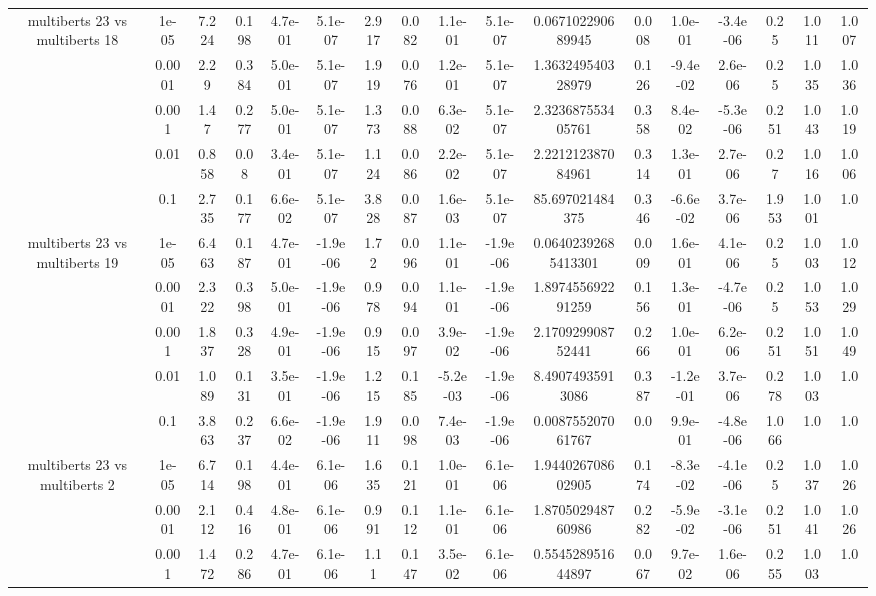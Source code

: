 \begin{tabular}{|c|c|c|c|c|c|c|c|c|c|c|c|c|c|c|c|c|}
\hline
\multirow{5}{*}{multiberts 23 vs multiberts 18} & 1e-05 & 7.224 & 0.198 & 4.7e-01 & 5.1e-07 & 2.917 & 0.082 & 1.1e-01 & 5.1e-07 & 0.067102290689945 & 0.008 & 1.0e-01 & -3.4e-06 & 0.25 & 1.011 & 1.007 \\
 & 0.0001 & 2.29 & 0.384 & 5.0e-01 & 5.1e-07 & 1.919 & 0.076 & 1.2e-01 & 5.1e-07 & 1.363249540328979 & 0.126 & -9.4e-02 & 2.6e-06 & 0.25 & 1.035 & 1.036 \\
 & 0.001 & 1.47 & 0.277 & 5.0e-01 & 5.1e-07 & 1.373 & 0.088 & 6.3e-02 & 5.1e-07 & 2.323687553405761 & 0.358 & 8.4e-02 & -5.3e-06 & 0.251 & 1.043 & 1.019 \\
 & 0.01 & 0.858 & 0.08 & 3.4e-01 & 5.1e-07 & 1.124 & 0.086 & 2.2e-02 & 5.1e-07 & 2.221212387084961 & 0.314 & 1.3e-01 & 2.7e-06 & 0.27 & 1.016 & 1.006 \\
 & 0.1 & 2.735 & 0.177 & 6.6e-02 & 5.1e-07 & 3.828 & 0.087 & 1.6e-03 & 5.1e-07 & 85.697021484375 & 0.346 & -6.6e-02 & 3.7e-06 & 1.953 & 1.001 & 1.0 \\
\hline
\multirow{5}{*}{multiberts 23 vs multiberts 19} & 1e-05 & 6.463 & 0.187 & 4.7e-01 & -1.9e-06 & 1.72 & 0.096 & 1.1e-01 & -1.9e-06 & 0.06402392685413301 & 0.009 & 1.6e-01 & 4.1e-06 & 0.25 & 1.003 & 1.012 \\
 & 0.0001 & 2.322 & 0.398 & 5.0e-01 & -1.9e-06 & 0.978 & 0.094 & 1.1e-01 & -1.9e-06 & 1.897455692291259 & 0.156 & 1.3e-01 & -4.7e-06 & 0.25 & 1.053 & 1.029 \\
 & 0.001 & 1.837 & 0.328 & 4.9e-01 & -1.9e-06 & 0.915 & 0.097 & 3.9e-02 & -1.9e-06 & 2.170929908752441 & 0.266 & 1.0e-01 & 6.2e-06 & 0.251 & 1.051 & 1.049 \\
 & 0.01 & 1.089 & 0.131 & 3.5e-01 & -1.9e-06 & 1.215 & 0.185 & -5.2e-03 & -1.9e-06 & 8.49074935913086 & 0.387 & -1.2e-01 & 3.7e-06 & 0.278 & 1.003 & 1.0 \\
 & 0.1 & 3.863 & 0.237 & 6.6e-02 & -1.9e-06 & 1.911 & 0.098 & 7.4e-03 & -1.9e-06 & 0.008755207061767 & 0.0 & 9.9e-01 & -4.8e-06 & 1.066 & 1.0 & 1.0 \\
\hline
\multirow{5}{*}{multiberts 23 vs multiberts 2} & 1e-05 & 6.714 & 0.198 & 4.4e-01 & 6.1e-06 & 1.635 & 0.121 & 1.0e-01 & 6.1e-06 & 1.944026708602905 & 0.174 & -8.3e-02 & -4.1e-06 & 0.25 & 1.037 & 1.026 \\
 & 0.0001 & 2.112 & 0.416 & 4.8e-01 & 6.1e-06 & 0.991 & 0.112 & 1.1e-01 & 6.1e-06 & 1.870502948760986 & 0.282 & -5.9e-02 & -3.1e-06 & 0.251 & 1.041 & 1.026 \\
 & 0.001 & 1.472 & 0.286 & 4.7e-01 & 6.1e-06 & 1.11 & 0.147 & 3.5e-02 & 6.1e-06 & 0.554528951644897 & 0.067 & 9.7e-02 & 1.6e-06 & 0.255 & 1.003 & 1.0 \\

\end{tabular}
